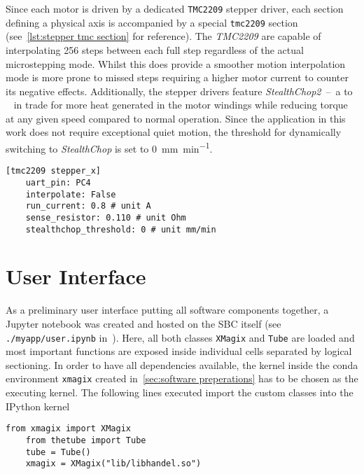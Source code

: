         Since each motor is driven by a dedicated \texttt{TMC2209} stepper driver, each section defining a physical axis is accompanied by a special \texttt{tmc2209} section (see~\cref{lst:stepper tmc section} for reference).
        The \textit{TMC2209} are capable of interpolating 256 steps between each full step regardless of the actual microstepping mode.
        Whilst this does provide a smoother motion interpolation mode is more prone to missed steps requiring a higher motor current to counter its negative effects.
        Additionally, the stepper drivers feature \textit{StealthChop2}~--~a  to ~\cite{Manual.TMC2209Datasheet} in trade for more heat generated in the motor windings while reducing torque at any given speed compared to normal operation.
        Since the application in this work does not require exceptional quiet motion, the threshold for dynamically switching to \textit{StealthChop} is set to \qty{0}{\milli\metre\per\minute}.
        \begin{lstlisting}[style=mydjango, firstnumber=31,
            caption={[Stepper corresponding stepper driver section of \texttt{printer.cfg}]Stepper corresponding stepper driver section of \texttt{printer.cfg}.},
            label={lst:stepper tmc section}%
            ]
    [tmc2209 stepper_x]
    uart_pin: PC4
    interpolate: False
    run_current: 0.8 # unit A
    sense_resistor: 0.110 # unit Ohm
    stealthchop_threshold: 0 # unit mm/min
        \end{lstlisting}

    \clearpage
    \section{User Interface}\label{sec:user interface}
        As a preliminary user interface putting all software components together, a Jupyter notebook was created and hosted on the SBC itself (see \texttt{./myapp/user.ipynb} in~\cite{Software.XraythesisHandel.2023}).
        Here, all both classes \texttt{XMagix} and \texttt{Tube} are loaded and most important functions are exposed inside individual cells separated by logical sectioning.
        In order to have all dependencies available, the kernel inside the conda environment \texttt{xmagix} created in~\cref{sec:software preperations} has to be chosen as the executing kernel.
        The following lines executed import the custom classes into the IPython kernel
        \begin{lstlisting}[style=mypython, firstnumber=auto]
    from xmagix import XMagix
    from thetube import Tube
    tube = Tube()
    xmagix = XMagix("lib/libhandel.so")
        \end{lstlisting}
